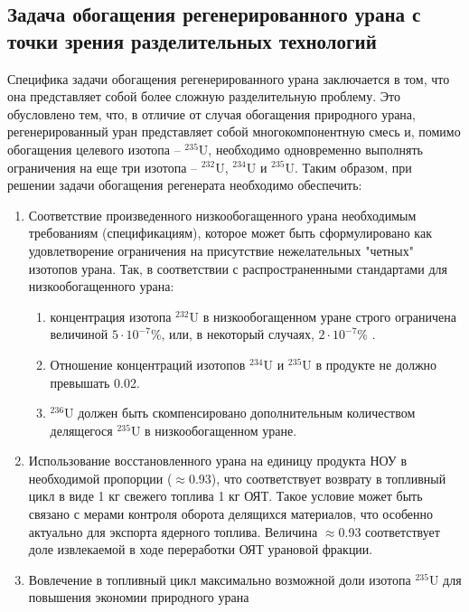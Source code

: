 \subsection{Задача обогащения регенерированного урана с точки зрения разделительных технологий}

Специфика задачи обогащения регенерированного урана заключается в том, что она представляет собой более сложную разделительную проблему.
Это обусловлено тем, что, в отличие от случая обогащения природного урана, регенерированный уран представляет собой многокомпонентную смесь и, помимо обогащения целевого изотопа -- $^{235}$U, необходимо одновременно выполнять ограничения на еще три изотопа -- $^{232}$U, $^{234}$U и $^{235}$U.
Таким образом, при решении задачи обогащения регенерата необходимо обеспечить:
\begin{enumerate}
  \item Соответствие произведенного низкообогащенного урана необходимым требованиям (спецификациям), которое может быть сформулировано как удовлетворение ограничения на присутствие нежелательных "четных" изотопов урана. Так, в соответствии с распространенными стандартами для низкообогащенного урана:
  \begin{enumerate}
    \item концентрация изотопа $^{232}$U в низкообогащенном уране строго ограничена величиной $5\cdot10^{-7}$\%, или, в некоторый случаях, $2\cdot10^{-7}$\% \cite{smirnovKaskadnyeShemyZadachah2012}.
    \item Отношение концентраций изотопов $^{234}$U и $^{235}$U в продукте не должно превышать 0.02.
    \item $^{236}$U должен быть скомпенсировано дополнительным количеством делящегося $^{235}$U в низкообогащенном уране.
  \end{enumerate}
  \item Использование восстановленного урана на единицу продукта НОУ в необходимой пропорции ($\approx$0.93), что соответствует возврату в топливный цикл в виде 1 кг свежего топлива 1 кг ОЯТ. Такое условие может быть связано с мерами контроля оборота делящихся материалов, что особенно актуально для экспорта ядерного топлива. Величина  $\approx$0.93 соответствует доле извлекаемой в ходе переработки ОЯТ урановой фракции.
  \item Вовлечение в топливный цикл максимально возможной доли изотопа $^{235}$U для повышения экономии природного урана
\end{enumerate}


